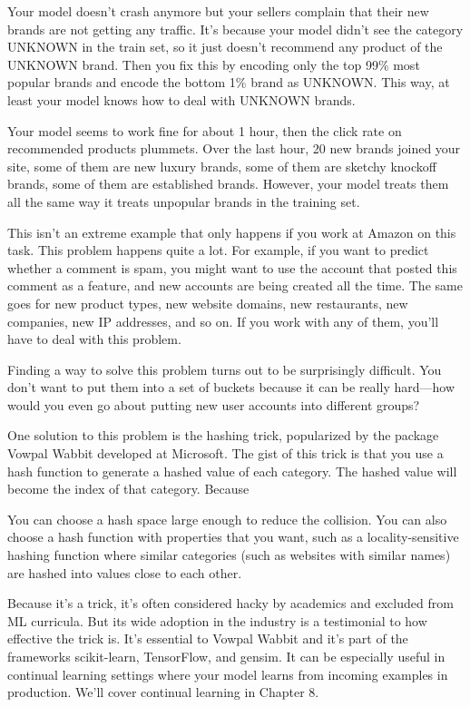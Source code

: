 \documentclass[openany]{book}
\begin{document}
Your model doesn’t crash anymore but your sellers complain that their new brands are not getting any traffic. It’s because your model didn’t see the category UNKNOWN in the train set, so it just doesn’t recommend any product of the UNKNOWN brand. Then you fix this by encoding only the top 99\% most popular brands and encode the bottom 1\% brand as UNKNOWN. This way, at least your model knows how to deal with UNKNOWN brands.

Your model seems to work fine for about 1 hour, then the click rate on recommended products plummets. Over the last hour, 20 new brands joined your site, some of them are new luxury brands, some of them are sketchy knockoff brands, some of them are established brands. However, your model treats them all the same way it treats unpopular brands in the training set.

This isn’t an extreme example that only happens if you work at Amazon on this task. This problem happens quite a lot. For example, if you want to predict whether a comment is spam, you might want to use the account that posted this comment as a feature, and new accounts are being created all the time. The same goes for new product types, new website domains, new restaurants, new companies, new IP addresses, and so on. If you work with any of them, you’ll have to deal with this problem.

Finding a way to solve this problem turns out to be surprisingly difficult. You don’t want to put them into a set of buckets because it can be really hard—how would you even go about putting new user accounts into different groups?

One solution to this problem is the hashing trick, popularized by the package Vowpal Wabbit developed at Microsoft. The gist of this trick is that you use a hash function to generate a hashed value of each category. The hashed value will become the index of that category. Because 

You can choose a hash space large enough to reduce the collision. You can also choose a hash function with properties that you want, such as a locality-sensitive hashing function where similar categories (such as websites with similar names) are hashed into values close to each other.

Because it’s a trick, it’s often considered hacky by academics and excluded from ML curricula. But its wide adoption in the industry is a testimonial to how effective the trick is. It’s essential to Vowpal Wabbit and it’s part of the frameworks scikit-learn, TensorFlow, and gensim. It can be especially useful in continual learning settings where your model learns from incoming examples in production. We’ll cover continual learning in Chapter 8.
\end{document}
